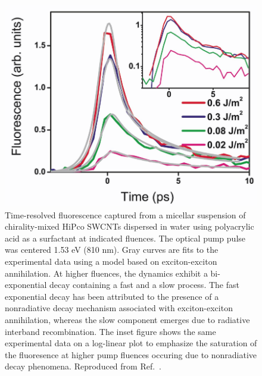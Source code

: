 \begin{figure}[H]
	\centering
	\includegraphics[scale=0.25]{images/chapter_prior_works/fluorescence_wang_2004}
	\caption{Time-resolved fluorescence captured from a micellar suspension of chirality-mixed HiPco SWCNTs dispersed in water using polyacrylic acid as a surfactant at indicated fluences. The optical pump pulse was centered 1.53 eV (810 nm). Gray curves are fits to the experimental data using a model based on exciton-exciton annihilation. At higher fluences, the dynamics exhibit a bi-exponential decay containing a fast and a slow process. The fast exponential decay has been attributed to the presence of a nonradiative decay mechanism associated with exciton-exciton annihilation, whereas the slow component emerges due to radiative interband recombination. The inset figure shows the same experimental data on a log-linear plot to emphasize the saturation of the fluoresence at higher pump fluences occuring due to nonradiative decay phenomena. Reproduced from Ref.\ \cite{wang2004observation}.}
	\label{fig:fluorescence_wang_2004}
\end{figure}


